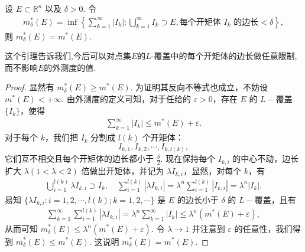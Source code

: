 \documentclass[../../main.tex]{subfiles}%
\begin{document}
\begin{lemma}
设 \(E \subset \mathbb{R}^n\) 以及 \(\delta > 0\). 令
\begin{align*}
m^*_{\delta}(E) = \inf\left\{ \sum_{k = 1}^{\infty} |I_k| : \bigcup_{k = 1}^{\infty} I_k \supset E, \text{每个开矩体 } I_k \text{ 的边长} < \delta \right\},
\end{align*}
则 \(m^*_{\delta}(E)=m^*(E)\).
\end{lemma}
\begin{note}
这个引理告诉我们,今后可以对点集$E$的$L$-覆盖中的每个开矩体的边长做任意限制,而不影响$E$的外测度的值.
\end{note}
\begin{proof}

显然有 \(m^*_{\delta}(E) \geqslant  m^*(E)\). 为证明其反向不等式也成立，不妨设 \(m^*(E)< + \infty\). 由外测度的定义可知，对于任给的 \(\varepsilon > 0\)，存在 \(E\) 的 \(L -\)覆盖 \(\{I_k\}\)，使得
\begin{align*}
\sum_{k = 1}^{\infty} |I_k| \leqslant  m^*(E) + \varepsilon.
\end{align*}
对于每个 \(k\)，我们把 \(I_k\) 分割成 \(l(k)\) 个开矩体：
\[
I_{k,1}, I_{k,2}, \cdots, I_{k,l(k)},
\]
它们互不相交且每个开矩体的边长都小于 \(\frac{\delta}{2}\). 现在保持每个 \(I_{k,i}\) 的中心不动，边长扩大 \(\lambda(1 < \lambda < 2)\) 倍做出开矩体，并记为 \(\lambda I_{k,i}\)，显然，对每个 \(k\)，有
\begin{align*}
\bigcup_{i = 1}^{l(k)} \lambda I_{k,i} \supset I_k, \quad \sum_{i = 1}^{l(k)} |\lambda I_{k,i}| = \lambda^n \sum_{i = 1}^{l(k)} |I_{k,i}| = \lambda^n |I_k|.
\end{align*}
易知 \(\{\lambda I_{k,i} : i = 1,2,\cdots, l(k); k = 1,2,\cdots\}\) 是 \(E\) 的边长小于 \(\delta\) 的 \(L -\)覆盖，且有
\begin{align*}
\sum_{k = 1}^{\infty} \sum_{i = 1}^{l(k)} |\lambda I_{k,i}| = \lambda^n \sum_{k = 1}^{\infty} |I_k| \leqslant  \lambda^n (m^*(E) + \varepsilon),
\end{align*}
从而可知 \(m^*_{\delta}(E) \leqslant  \lambda^n (m^*(E) + \varepsilon)\). 令 \(\lambda \to 1\) 并注意到 \(\varepsilon\) 的任意性，我们得到 \(m^*_{\delta}(E) \leqslant  m^*(E)\). 这说明 \(m^*_{\delta}(E)=m^*(E)\).

\end{proof}
\end{document}
